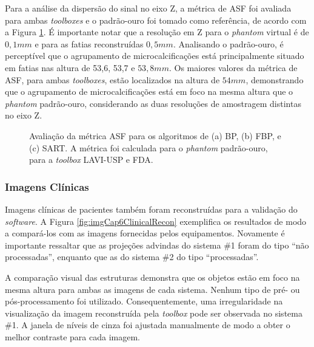 Para a análise da dispersão do sinal no eixo Z, a métrica de \acs{ASF} foi avaliada para ambas \textit{toolboxes} e o padrão-ouro foi tomado como referência, de acordo com a Figura \ref{fig:imgCap6VCTASF}. É importante notar que a resolução em Z para o \textit{phantom} virtual é de $0,1mm$ e para as fatias reconstruídas $0,5 mm$. Analisando o padrão-ouro, é perceptível que o agrupamento de microcalcificações está principalmente situado em fatias nas altura de 53,6, 53,7 e $53,8mm$. Os maiores valores da métrica de \acs{ASF}, para ambas \textit{toolboxes}, estão localizados na altura de $54mm$, demonstrando que o agrupamento de microcalcificações está em foco na mesma altura que o \textit{phantom} padrão-ouro, considerando as duas resoluções de amostragem distintas no eixo Z.

\begin{figure}[!ht]
	
	\centering	
	\caption{ Avaliação da métrica \acs{ASF} para os algoritmos de (a) \acs{BP}, (b) \acs{FBP}, e (c) \acs{SART}. A métrica foi calculada para o \textit{phantom} padrão-ouro, para a \textit{toolbox} LAVI-USP e FDA.}
	\hfill


	\label{fig:imgCap6VCTASF}
\end{figure}


\subsubsection{Imagens Clínicas}

Imagens clínicas de pacientes também foram reconstruídas para a validação do \textit{software}. A Figura \ref{fig:imgCap6ClinicalRecon} exemplifica os resultados de modo a compará-los com as imagens fornecidas pelos equipamentos. Novamente é importante ressaltar que as projeções advindas do sistema \#1 foram do tipo ``não processadas'', enquanto que as do sistema \#2 do tipo ``processadas''. 

A comparação visual das estruturas demonstra que os objetos estão em foco na mesma altura para ambas as imagens de cada sistema. Nenhum tipo de pré- ou pós-processamento foi utilizado. Consequentemente, uma irregularidade na visualização da imagem reconstruída pela \textit{toolbox} pode ser observada no sistema \#1. A janela de níveis de cinza foi ajustada manualmente de modo a obter o melhor contraste para cada imagem.

